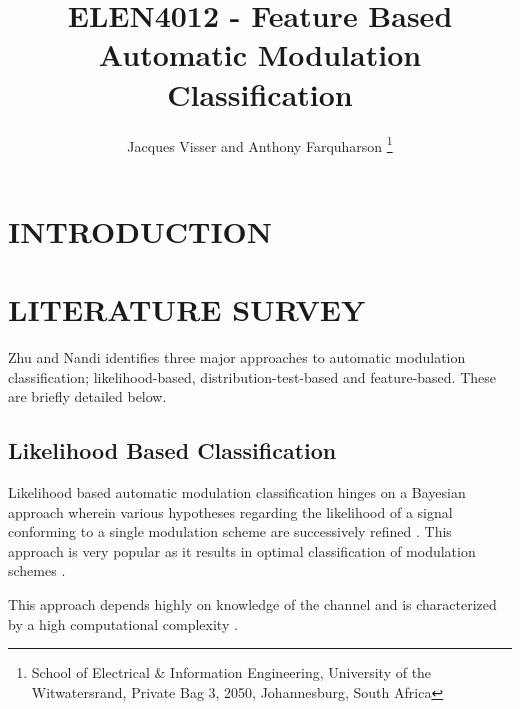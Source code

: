 \documentclass[10pt,twocolumn]{witseiepaper}
\begin{document}
\title{ELEN4012 - Feature Based Automatic Modulation Classification}

\author{Jacques Visser and Anthony Farquharson
\thanks{School of Electrical \& Information Engineering, University of the
Witwatersrand, Private Bag 3, 2050, Johannesburg, South Africa}
}



\maketitle
\thispagestyle{empty}\pagestyle{empty}

\section{INTRODUCTION}

\section{LITERATURE SURVEY}
Zhu and Nandi \cite{zhu2014automatic} identifies three major approaches to automatic modulation classification; likelihood-based, distribution-test-based and feature-based. These are briefly detailed below.
	\subsection{Likelihood Based Classification}
	Likelihood based automatic modulation classification hinges on a Bayesian approach wherein various hypotheses regarding the likelihood of a signal conforming to a single modulation scheme are successively refined \cite{zhu2014automatic}. This approach is very popular as it results in optimal classification of modulation schemes \cite{zhu2014automatic}.

	This approach depends highly on knowledge of the channel and is characterized by a high computational complexity \cite{zhu2014automatic}. 
\end{document}
